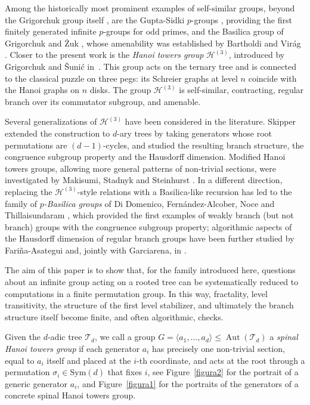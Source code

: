 \documentclass[11pt,leqno]{amsart}
\theoremstyle{plain}
\newcommand\T{{\mathcal{T}}}
\DeclareMathOperator{\Aut}{Aut}
\newcommand{\Sym}{\mathrm{Sym}}
\numberwithin{equation}{section}
\begin{document}
Among the historically most prominent examples of self-similar groups, beyond the Grigorchuk group itself \cite{Grigorchuk80}, are the Gupta-Sidki $p$-groups \cite{GuptaSidki83}, providing the first finitely generated infinite $p$-groups for odd primes, and the Basilica group of Grigorchuk and \.{Z}uk \cite{GrigorchukZuk02}, whose amenability was established by Bartholdi and Vir\'ag \cite{BartholdiVirag05}. Closer to the present work is the \emph{Hanoi towers group} $\mathcal{H}^{(3)}$, introduced by Grigorchuk and \v{S}uni\'c in~\cite{Sunic, GrigorchukSunik07}. This group acts on the ternary tree and is  connected to the classical puzzle on three pegs: its Schreier graphs at level $n$ coincide with the Hanoi graphs on $n$ disks. The group $\mathcal{H}^{(3)}$ is self-similar, contracting, regular branch over its commutator subgroup, and amenable.

Several generalizations of $\mathcal{H}^{(3)}$ have been considered in the literature. Skipper \cite{Rachel} extended the construction to $d$-ary trees by taking generators whose root permutations are $(d{-}1)$-cycles, and studied the resulting branch structure, the congruence subgroup property and the Hausdorff dimension. Modified Hanoi towers groups, allowing more general patterns of non-trivial sections, were investigated by Makisumi, Stadnyk and Steinhurst \cite{modified}. In a different direction, replacing the $\mathcal{H}^{(3)}$-style relations with a Basilica-like recursion has led to the family of \emph{$p$-Basilica groups} of Di Domenico, Fern\'andez-Alcober, Noce and Thillaisundaram \cite{p-Basilica}, which provided the first examples of weakly branch (but not branch) groups with the congruence subgroup property; algorithmic aspects of the Hausdorff dimension of regular branch groups have been further studied by Fari\~na-Asategui \cite{jorge} and, jointly with Garciarena, in \cite{FG24}.

The aim of this paper is to show that, for the family introduced here, questions about an infinite group acting on a rooted tree can be systematically reduced to computations in a finite permutation group. In this way, fractality, level transitivity, the structure of the first level stabilizer, and ultimately the branch structure itself become finite, and often algorithmic, checks.


\medskip


Given the $d$-adic tree
$\T_d$, we call a group $G=\langle a_1,\dots,a_d\rangle\leq\Aut(\T_d)$ a
\emph{spinal Hanoi towers group} if each generator $a_i$ has precisely one
non-trivial section, equal to $a_i$ itself and placed at the $i$-th coordinate,
and acts at the root through a permutation $\sigma_i\in\Sym(d)$ that fixes $i$, see Figure~\ref{figura2} for the portrait of a generic generator $a_i$, and Figure~\ref{figura1} for the portraits of the generators of a concrete spinal Hanoi towers group.
\end{document}
